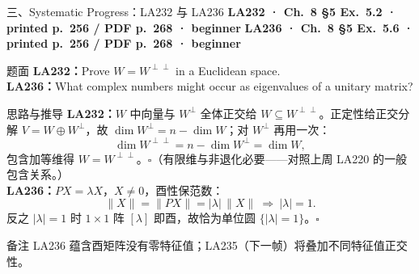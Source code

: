 \documentclass[aspectratio=169,10pt,fontset=none]{ctexbeamer}
\newcommand{\ex}[1]{\textcolor{accent}{\footnotesize\bfseries #1}}
\begin{document}
\begin{frame}[t]{三、Systematic Progress：LA232 与 LA236}
  \leavevmode\ex{LA232 · Ch.~8 §5 Ex.~5.2 · printed p.~256 / PDF p.~268 · beginner}\quad
  \ex{LA236 · Ch.~8 §5 Ex.~5.6 · printed p.~256 / PDF p.~268 · beginner}
  \begin{block}{\footnotesize 题面}
    \scriptsize \textbf{LA232：}Prove $W=W^{\perp\perp}$ in a Euclidean space.\\
    \textbf{LA236：}What complex numbers might occur as eigenvalues of a unitary matrix?
  \end{block}
  \begin{exampleblock}{\footnotesize 思路与推导}
    \scriptsize
    \textbf{LA232：}$W$ 中向量与 $W^\perp$ 全体正交给 $W\subseteq W^{\perp\perp}$。正定性给正交分解 $V=W\oplus W^\perp$，故 $\dim W^\perp=n-\dim W$；对 $W^\perp$ 再用一次：
    $$\dim W^{\perp\perp}=n-\dim W^\perp=\dim W,$$
    包含加等维得 $W=W^{\perp\perp}$。$\square$（有限维与非退化必要——对照上周 LA220 的一般包含关系。）\\[2pt]
    \textbf{LA236：}$PX=\lambda X$，$X\ne0$，酉性保范数：
    $$\lVert X\rVert=\lVert PX\rVert=|\lambda|\,\lVert X\rVert\ \Longrightarrow\ |\lambda|=1.$$
    反之 $|\lambda|=1$ 时 $1\times1$ 阵 $[\lambda]$ 即酉，故恰为单位圆 $\{|\lambda|=1\}$。$\square$
  \end{exampleblock}
  \begin{block}{\footnotesize 备注}
    \scriptsize LA236 蕴含酉矩阵没有零特征值；LA235（下一帧）将叠加不同特征值正交性。
  \end{block}
\end{frame}
\end{document}
